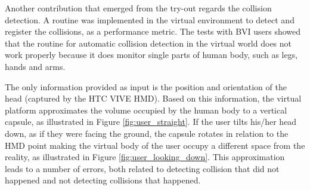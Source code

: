         Another contribution that emerged from the try-out regards the collision detection. A routine was implemented in the virtual environment to detect and register the collisions, as a performance metric. The tests with BVI users showed that the routine for automatic collision detection in the virtual world does not work properly because it does monitor single parts of human body, such as legs, hands and arms. 

        The only information provided as input is the position and orientation of the head (captured by the HTC VIVE HMD). Based on this information, the virtual platform approximates the volume occupied by the human body to a vertical capsule, as illustrated in Figure \ref{fig:user_straight}. If the user tilts his/her head down, as if they were facing the ground, the capsule rotates in relation to the HMD point making the virtual body of the user occupy a different space from the reality, as illustrated in Figure \ref{fig:user_looking_down}. This approximation leads to a number of errors, both related to detecting collision that did not happened and not detecting collisions that happened.

